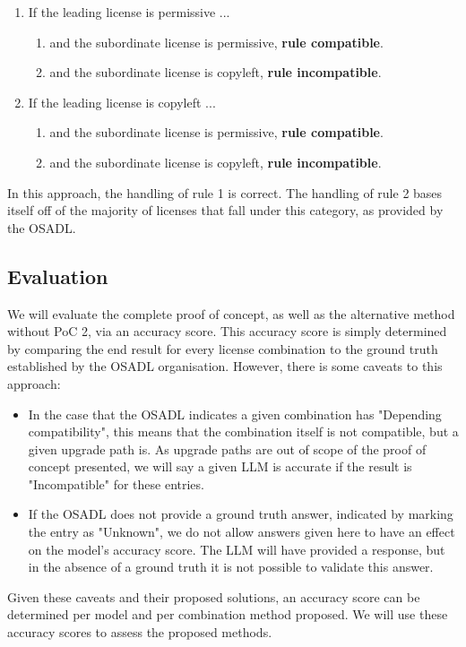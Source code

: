 \begin{enumerate}
	\item If the leading license is permissive ...
	\begin{enumerate}
		\item and the subordinate license is permissive, \textbf{rule compatible}.
		\item and the subordinate license is copyleft, \textbf{rule incompatible}.
	\end{enumerate}
	\item If the leading license is copyleft ...
	\begin{enumerate}
		\item and the subordinate license is permissive, \textbf{rule compatible}.
		\item and the subordinate license is copyleft, \textbf{rule incompatible}.
	\end{enumerate}
\end{enumerate}

In this approach, the handling of rule 1 is correct. The handling of rule 2 bases itself off of the majority of licenses that fall under this category, as provided by the OSADL.

\subsection{Evaluation}

We will evaluate the complete proof of concept, as well as the alternative method without PoC 2, via an accuracy score. This accuracy score is simply determined by comparing the end result for every license combination to the ground truth established by the OSADL organisation. However, there is some caveats to this approach:

\begin{itemize}
	\item In the case that the OSADL indicates a given combination has "Depending compatibility", this means that the combination itself is not compatible, but a given upgrade path is. As upgrade paths are out of scope of the proof of concept presented, we will say a given LLM is accurate if the result is "Incompatible" for these entries.
	\item If the OSADL does not provide a ground truth answer, indicated by marking the entry as "Unknown", we do not allow answers given here to have an effect on the model's accuracy score. The LLM will have provided a response, but in the absence of a ground truth it is not possible to validate this answer.
\end{itemize}

Given these caveats and their proposed solutions, an accuracy score can be determined per model and per combination method proposed. We will use these accuracy scores to assess the proposed methods.